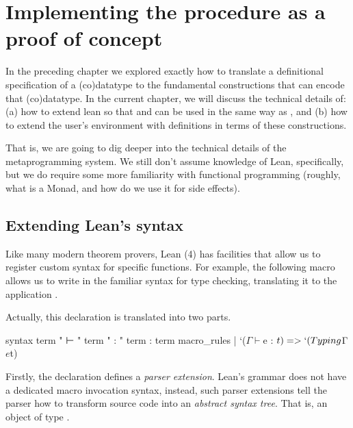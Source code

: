 




\chapter{Implementing the procedure as a proof of concept}
\label{ch:implementing}


In the preceding chapter we explored exactly how to translate a definitional specification of a (co)datatype to the fundamental constructions that can encode that (co)datatype.
In the current chapter, we will discuss the technical details of: (a) how to extend lean so that \data and \codata can be used in the same way as \inductive, and (b) how to extend the user's environment with definitions in terms of these constructions.

That is, we are going to dig deeper into the technical details of the metaprogramming system.
We still don't assume knowledge of Lean, specifically, but we do require some more familiarity with functional programming (roughly, what is a Monad, and how do we use it for side effects). \cite{ullrichNotationsHygienicMacro2022}\cite{paulinoMetaprogrammingLean}


\section{Extending Lean's syntax}
\label{sec:syntax}

Like many modern theorem provers, Lean (4) has facilities that allow us to register custom syntax for specific functions. For example, the following macro allows us to write  in the familiar syntax for type checking, translating it to the application .
Actually, this  declaration is translated into two parts.

\begin{leancode}
    syntax term " ⊢ " term " : " term : term
    macro_rules
      | `($Γ ⊢ $e : $t) => `(Typing $Γ $e $t)
\end{leancode}

Firstly, the  declaration defines a \emph{parser extension}.
Lean's grammar does not have a dedicated macro invocation syntax, instead, such parser extensions tell the parser how to transform source code into an \emph{abstract syntax tree}. That is, an object of type .

